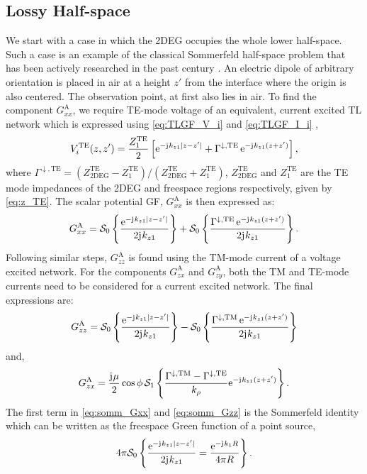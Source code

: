 \documentclass[12pt]{article}
\begin{document}
\subsection{Lossy Half-space}
%
We start with a case in which the 2DEG occupies the whole lower half-space. Such a case is an example of the classical Sommerfeld half-space problem that has been actively researched in the past century \cite{Wait1961,Michalski1985}.  An electric dipole of arbitrary orientation is placed in air at a height $z'$ from the interface where the origin is also centered. The observation point, at first also lies in air. To find the component $G_{xx}^\mathrm{A}$, we require TE-mode voltage of an equivalent, current excited TL network which is expressed using \eqref{eq:TLGF_V_i} and \eqref{eq:TLGF_I_i} \cite[Sec. 2.4]{Felsen1994} \cite{Michalski1997},
%
\begin{equation}
  V_i^{\mathrm{TE}}(z,z') = \frac{Z_1^{\mathrm{TE}}}{2} \left [ \mathrm{e}^{-\mathrm{j}\mkern1mu k_{z1} |z - z'|} + \Gamma^{\downarrow, \mathrm{TE}} \, \mathrm{e}^{-\mathrm{j}\mkern1mu k_{z1} (z + z')} \right],
  \label{eq:Vi_halfspace}
\end{equation}
%
where $\Gamma^{\downarrow, \mathrm{TE}} = (Z_{\mathrm{2DEG}}^{\mathrm{TE}} -  Z_1^{\mathrm{TE}})/(Z_{\mathrm{2DEG}}^{\mathrm{TE}} +  Z_1^{\mathrm{TE}})$,   $Z_{\mathrm{2DEG}}^{\mathrm{TE}}$ and $Z_1^{\mathrm{TE}}$ are the TE mode impedances of the 2DEG and freespace regions respectively, given by \eqref{eq:z_TE}. The scalar potential GF, $G_{xx}^\mathrm{A}$ is then expressed as:
%
\begin{equation}
  G_{xx}^\mathrm{A} = \mathcal{S}_0 \left \{ \frac{\mathrm{e}^{-\mathrm{j}\mkern1mu k_{z1} |z - z'|}}{2 \mathrm{j}\mkern1mu k_{z1}} \right \} + \mathcal{S}_0 \left \{ \frac{\Gamma^{\downarrow, \mathrm{TE}} \, \mathrm{e}^{-\mathrm{j}\mkern1mu k_{z1} (z + z')}}{2 \mathrm{j}\mkern1mu k_{z1}} \right \}.
  \label{eq:somm_Gxx}
\end{equation}
%
Following similar steps, $G_{zz}^\mathrm{A}$ is found using the TM-mode current of a voltage excited network. For the components $G_{zx}^\mathrm{A}$ and $G_{zy}^\mathrm{A}$, both the TM and TE-mode currents need to be considered for a current excited network. The final expressions are:
%
\begin{equation}
  G_{zz}^\mathrm{A} = \mathcal{S}_0 \left \{ \frac{\mathrm{e}^{-\mathrm{j}\mkern1mu k_{z1} |z - z'|}}{2 \mathrm{j}\mkern1mu k_{z1}} \right \} - \mathcal{S}_0 \left \{ \frac{\Gamma^{\downarrow, \mathrm{TM}} \, \mathrm{e}^{-\mathrm{j}\mkern1mu k_{z1} (z + z')}}{2 \mathrm{j}\mkern1mu k_{z1}} \right \}
  \label{eq:somm_Gzz}
\end{equation}
%
and,
%
\begin{equation}
  G_{zx}^\mathrm{A} = \frac{\mathrm{j}\mkern1mu \mu}{2} \cos \phi \, \mathcal{S}_1 \left \{ \frac{\Gamma^{\downarrow, \mathrm{TM}} - \Gamma^{\downarrow, \mathrm{TE}}}{ k_{\rho}} \mathrm{e}^{-\mathrm{j}\mkern1mu k_{z1} (z + z')} \right \}.
  \label{eq:somm_Gzx}
\end{equation}
%
The first term in \eqref{eq:somm_Gxx} and \eqref{eq:somm_Gzz} is the Sommerfeld identity which can be written as the freespace Green function of a point source,
%
\begin{equation}
   4 \pi \mathcal{S}_0 \left \{ \frac{\mathrm{e}^{-\mathrm{j}\mkern1mu k_{z1} |z - z'|}}{2 \mathrm{j}\mkern1mu k_{z1}} = \frac{\mathrm{e}^{-\mathrm{j}\mkern1mu k_1 R}}{4 \pi R} \right \}.
   \label{eq:somm_id}
\end{equation}
%
\end{document}

